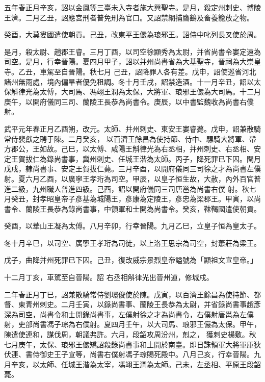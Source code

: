 \begin{pinyinscope}
 五年春正月辛亥，詔以金鳳等三臺未入寺者施大興聖寺。是月，殺定州刺史、博陵王濟。二月乙丑，詔應宮刑者普免刑為官口。又詔禁網捕鷹鷂及畜養籠放之物。



 癸酉，大莫婁國遣使朝貢。己丑，改東平王儼為琅邪王。詔侍中叱列長叉使於周。



 是月，殺太尉、趙郡王睿。三月丁酉，以司空徐顯秀為太尉，并省尚書令婁定遠為司空。是月，行幸晉陽。夏四月甲子，詔以并州尚書省為大基聖寺，晉祠為大崇皇寺。乙丑，車駕至自晉陽。秋七月
 己丑，詔降罪人各有差。戊申，詔使巡省河北諸州無雨處，境內偏旱者優免租調。冬十月壬戌，詔禁造酒。十一月辛丑，詔以太保斛律光為太傅，大司馬、馮翊王潤為太保，大將軍、琅邪王儼為大司馬。十二月庚午，以開府儀同三司、蘭陵王長恭為尚書令。庚辰，以中書監魏收為尚書右僕射。



 武平元年春正月乙酉朔，改元。太師、并州刺史、東安王婁睿薨。戊申，詔兼散騎常侍裴獻之聘于陳。二月癸亥，
 以百濟王餘昌為使持節、侍中、驃騎大將軍、帶方郡公，王如故。己巳，以太傅、咸陽王斛律光為右丞相，并州刺史、右丞相、安定王賀拔仁為錄尚書事，冀州刺史、任城王湝為太師。丙子，降死罪已下囚。閏月戊戌，隸尚書事、安定王賀拔仁薨。三月辛酉，以開府儀同三司徐之才為尚書左僕射。夏六月乙酉，以廣寧王孝珩為司空。甲辰，以皇子恒生故，大赦，內外百官普進二級，九州職人普進四級。己酉，詔以開府儀同三司唐邕為尚書右僕
 射。秋七月癸丑，封孝昭皇帝子彥基為城陽王，彥康為定陵王，彥忠為梁郡王。甲寅，以尚書令、蘭陵王長恭為錄尚書事，中領軍和士開為尚書令。癸亥，靺鞨國遣使朝貢。



 癸酉，以華山王凝為太傅。八月辛卯，行幸晉陽。九月乙巳，立皇子恒為皇太子。



 冬十月辛巳，以司空、廣寧王孝珩為司徒，以上洛王思宗為司空，封蕭莊為梁王。



 戊子，曲降并州死罪已下囚。己丑，復改威宗景烈皇帝謚號為「顯祖文宣皇帝。」



 十二月丁亥，車駕至自晉陽。詔
 右丞相斛律光出晉州道，修城戍。



 二年春正月丁巳，詔兼散騎常侍劉環俊使於陳。戊寅，以百濟王餘昌為使持節、都督、東青州刺史。二月壬寅，以錄尚書事、蘭陵王長恭為太尉，并省錄尚書事趙彥深為司空，尚書令和士開錄尚書事，左僕射徐之才為尚書令，右僕射唐邕為左僕射，吏部尚書馮子琮為右僕射。夏四月壬午，以大司馬、琅邪王儼為太保。甲午，陳遣使連和，謀伐周，朝議弗許。六月，段韶攻周汾州，剋之，
 獲刺史楊敷。秋七月庚午，太保、琅邪王儼矯詔殺錄尚書事和土開於南臺。即日誅領軍大將軍厙狄伏連、書侍御史王子宣等，尚書右僕射馮子琮賜死殿中。八月己亥，行幸晉陽。九月辛亥，以太師、任城王湝為太宰，馮翊王潤為太師。己未，左丞相、平原王段韶薨。




\end{pinyinscope}
